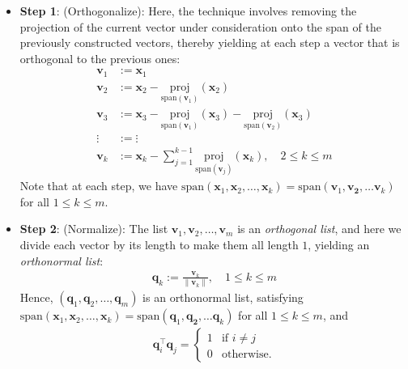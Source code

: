 \documentclass[12pt, a4paper]{article}
\theoremstyle{definition}
\begin{document}
	\begin{itemize}
		\item \textbf{Step 1}: (Orthogonalize): Here, the technique involves
		removing the projection of the current vector under consideration
		onto the span of the previously constructed vectors, thereby
		yielding at each step a vector that is orthogonal to the previous ones:
		\begin{align*}
			\mathbf{v}_1 &:= \mathbf{x}_1\\
			\mathbf{v}_2 &:= \mathbf{x}_2 - \underset{\text{span}(\mathbf{v}_1)}{\text{proj}}(\mathbf{x}_2)\\
			\mathbf{v}_3 &:= \mathbf{x}_3 -\underset{\text{span}(\mathbf{v}_1)}{\text{proj}}(\mathbf{x}_3)
			-\underset{\text{span}(\mathbf{v}_2)}{\text{proj}}(\mathbf{x}_3)\\
			\vdots &:= \vdots\\
			\mathbf{v}_k &:= \mathbf{x}_k - \sum_{j=1}^{k-1}
			\underset{\text{span}(\mathbf{v}_j)}{\text{proj}}(\mathbf{x}_k),
			\quad 2\leq k\leq m
		\end{align*}
		Note that at each step, we have 
		$\text{span}(\mathbf{x}_1,\mathbf{x}_2,\ldots,\mathbf{x}_k)
		=\text{span}(\mathbf{v}_1,\mathbf{v_2},\ldots\mathbf{v}_k)$
		for all $1\leq k\leq m$.
		\item \textbf{Step 2}: (Normalize): The list $\mathbf{v}_1,\mathbf{v}_2,\ldots,
		\mathbf{v}_m$ is an \textit{orthogonal list}, and here we divide each
		vector by its length to make them all length $1$, yielding an \textit{orthonormal list}:
		\begin{align*}
			\mathbf{q}_k := \frac{\mathbf{v}_k}{\|\mathbf{v}_k\|},\quad 1\leq k\leq m
		\end{align*}
		Hence, $(\mathbf{q}_1,\mathbf{q}_2,\ldots,\mathbf{q}_m)$ is an orthonormal
		list, satisfying
		$\text{span}(\mathbf{x}_1,\mathbf{x}_2,\ldots,\mathbf{x}_k)
		=\text{span}(\mathbf{q}_1,\mathbf{q_2},\ldots\mathbf{q}_k)$ for all $1\leq k\leq m$,
		and
		\begin{align*}
			\mathbf{q}_i^\top \mathbf{q}_j=\begin{cases}
				1 & \text{if } i\neq j\\
				0 & \text{otherwise.}
			\end{cases}
		\end{align*}
	\end{itemize}
\end{document}
